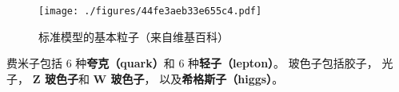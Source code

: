 
\begin{issues}
\issueDraft
\end{issues}

\begin{figure}[ht]
\centering
\texttt{[image: ./figures/44fe3aeb33e655c4.pdf]}
\caption{标准模型的基本粒子（来自维基百科）} \label{fig_BasPar_1}
\end{figure}



费米子包括 6 种\textbf{夸克（quark）}和 6 种\textbf{轻子（lepton）}。 玻色子包括胶子， 光子， \textbf{Z 玻色子}和 \textbf{W 玻色子}， 以及\textbf{希格斯子（higgs）}。
